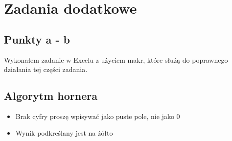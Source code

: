 \documentclass[12pt,a4paper]{article}
\begin{document}
\section{Zadania dodatkowe}

\subsection{Punkty a - b}

Wykonałem zadanie w Excelu z użyciem makr, które służą do poprawnego działania tej części zadania. 

\subsection{Algorytm hornera}

\begin{itemize}
    \item Brak cyfry proszę wpisywać jako puste pole, nie jako 0 
    \item Wynik podkreślany jest na żółto
\end{itemize}
\end{document}

